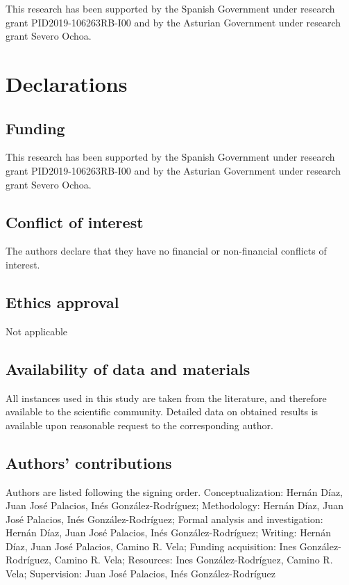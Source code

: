 \documentclass[sn-mathphys]{sn-jnl}%
\theoremstyle{thmstyleone}%
\theoremstyle{thmstyletwo}%
\theoremstyle{thmstylethree}%
\begin{document}
This research has been supported by the Spanish Government under research grant PID2019-106263RB-I00 and by the Asturian Government under research grant Severo Ochoa.


\section*{Declarations}

\subsection*{Funding}
This research has been supported by the Spanish Government under research grant PID2019-106263RB-I00 and by the Asturian Government under research grant Severo Ochoa.

\subsection*{Conflict of interest}
The authors declare that they have no financial or non-financial conflicts of interest.

\subsection*{Ethics approval}
Not applicable

\subsection*{Availability of data and materials}
All instances used in this study are taken from the literature, and therefore available to the scientific community. Detailed data on obtained results is available upon reasonable request to the corresponding author.


\subsection*{Authors' contributions}
Authors are listed following the signing order.
Conceptualization: Hernán Díaz, Juan José Palacios, Inés González-Rodríguez; Methodology: Hernán Díaz, Juan José Palacios, Inés González-Rodríguez; Formal analysis and investigation: Hernán Díaz, Juan José Palacios, Inés González-Rodríguez; Writing: Hernán Díaz, Juan José Palacios, Camino R. Vela; Funding acquisition: Ines González-Rodríguez, Camino R. Vela; Resources: Ines González-Rodríguez, Camino R. Vela; Supervision: Juan José Palacios, Inés González-Rodríguez
\end{document}
